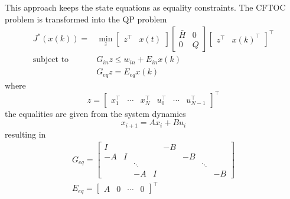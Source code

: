 This approach keeps the state equations as equality constraints. The CFTOC problem is transformed into the QP problem
\begin{align*}
    J^*(x(k)) =            & \min_{z}\begin{bmatrix}
                                         z^\top & x(t)
                                     \end{bmatrix}
    \begin{bmatrix}
        \bar{H} & 0 \\
        0       & Q
    \end{bmatrix}
    \begin{bmatrix}
        z^\top & x(k)^\top
    \end{bmatrix}^\top                                         \\
    \text{subject to}\quad & G_{in} z \leq w_{in} +E_{in} x(k) \\
                           & G_{eq} z = E_{eq} x(k)
\end{align*}
where
\begin{equation*}
    z = \begin{bmatrix}
        x_1^\top & \cdots & x_N^\top & u_0^\top & \cdots & u_{N-1}^\top
    \end{bmatrix}^\top
\end{equation*}
the equalities are given from the system dynamics
\begin{equation*}
    x_{i+1} = Ax_i + Bu_i
\end{equation*}
resulting in
\begin{gather*}
    G_{eq} = \left[
        \begin{array}{cccc|cccc} %
            I  &   &        &   & -B &    &        &    \\
            -A & I &        &   &    & -B &        &    \\
               &   & \ddots &   &    &    & \ddots &    \\
               &   & -A     & I &    &    &        & -B
        \end{array}
        \right] \\
    E_{eq} = \begin{bmatrix}
        A & 0 & \cdots & 0
    \end{bmatrix}^\top
\end{gather*}

